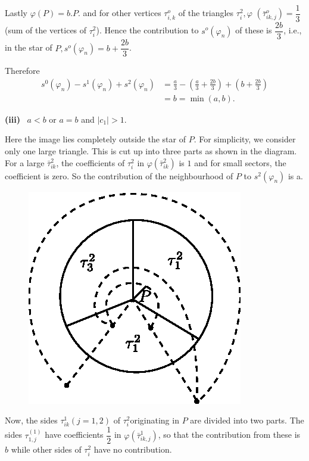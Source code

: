 Lastly $\varphi(P) = b. P$. and for other vertices $\tau^o_{i, k}$ of
the triangles $\tau^2_i, \varphi$ $(\bar{\tau}^o_{ik, j})=
\dfrac{1}{3}$ (sum of the vertices of $\tau^2_i$). Hence the
contribution to $s^o (\varphi_n)$ of these is $\dfrac{2b}{3}$, i.e.,
in the star of $P, s^o (\varphi_n) = b + \dfrac{2b}{3}$. 

Therefore
\begin{align*}
  s^0 (\varphi_n) - s^1 (\varphi_n) + s^2 (\varphi_n) & = \frac{a}{3} -
  \left(\frac{a}{3} + \frac{2b} {3}\right) + \left(b + \frac{2b}{3}\right)\\ 
  & = b = \min (a, b).
\end{align*}

\noindent
\textbf{(iii)}~ $a < b$ or $a = b$ and $|c_1| > 1$.

  Here the image lies completely outside the star of $P$. For
  simplicity, we consider only one large triangle. This is cut
  up into three parts as shown in the diagram. 
  For a large $\bar{\tau}^2_{ik}$, the coefficients of $\tau^2_i$ in
  $\varphi (\bar{\tau}^2_{ik})$ is $1$ and for small sectors, the
  coefficient is zero. So the contribution of the neighbourhood of $P$
  to $s^2 (\varphi_n)$ is a.  
   \begin{figure}[H]
    \centerline{\includegraphics{vol9-figures/fig9-20.eps}}
  \end{figure}
\medskip

Now, the sides $\tau^1_{ik} (j = 1, 2)$ of $\tau^2_i$\pageoriginale originating in
$P$ are divided into two parts. The sides $\tau^{(1)}_{1, j}$ have
coefficients $\dfrac{1}{2}$ in $\varphi (\bar{\tau}^1_{ik, j})$, so
that the contribution from these is $b$ while other sides of $\tau^2_i$
have no contribution. 

